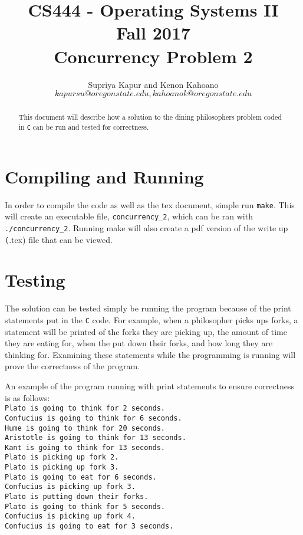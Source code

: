 \documentclass[onecolumn,letterpaper,10pt]{IEEEtran}
\title{CS444 - Operating Systems II
	\\Fall 2017
	\\Concurrency Problem 2
}
\author{Supriya Kapur and Kenon Kahoano\\
	\small{\(kapursu@oregonstate.edu, kahoanok@oregonstate.edu\)}
}
\begin{document}
\begin{titlingpage}
    \maketitle
    \begin{abstract}
	\noindent This document will describe how a solution to the dining philosophers problem coded in \texttt{C} can be run and tested for correctness.  
    \end{abstract}
\end{titlingpage}

\section{Compiling and Running}
\par In order to compile the code as well as the tex document, simple run \texttt{make}. This will create an executable file, \texttt{concurrency\_2}, which can be ran with \texttt{./concurrency\_2}. Running make will also create a pdf version of the write up \texttt(.tex) file that can be viewed. 

\section{Testing}
\par The solution can be tested simply be running the program because of the print statements put in the \texttt{C} code. For example, when a philosopher picks ups forks, a statement will be printed of the forks they are picking up, the amount of time they are eating for, when the put down their forks, and how long they are thinking for. Examining these statements while the programming is running will prove the correctness of the program. 

\par An example of the program running with print statements to ensure correctness is as follows: \\

\texttt{Plato is going to think for 2 seconds.\\
Confucius is going to think for 6 seconds. \\
Hume is going to think for 20 seconds. \\
Aristotle is going to think for 13 seconds.\\ 
Kant is going to think for 13 seconds. \\
Plato is picking up fork 2. \\
Plato is picking up fork 3.  \\
Plato is going to eat for 6 seconds.\\ 
Confucius is picking up fork 3. \\
Plato is putting down their forks.\\ 
Plato is going to think for 5 seconds.\\ 
Confucius is picking up fork 4.  \\
Confucius is going to eat for 3 seconds.}
\end{document}
